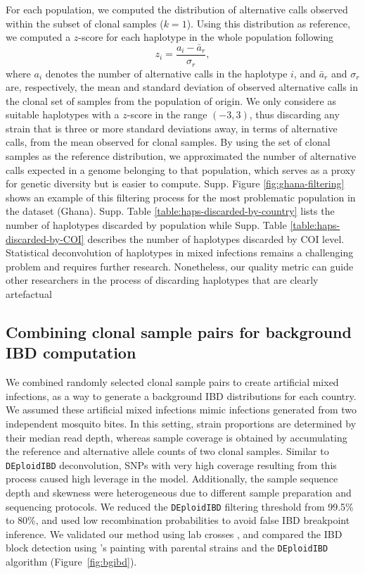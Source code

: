 \documentclass[9pt,lineno]{elife}
\begin{document}
\begin{appendixbox}
For each population, we computed the distribution of alternative calls observed within the subset of clonal samples ($k=1$). Using this distribution as reference, we computed a $z$-score for each haplotype in the whole population following $$z_i = \frac{a_i - \bar{a}_r}{\sigma_r},$$ where $a_i$ denotes the number of alternative calls in the haplotype $i$, and $\bar{a}_r$ and $\sigma_r$ are, respectively, the mean and standard deviation of observed alternative calls in the clonal set of samples from the population of origin. We only considere as suitable haplotypes with a $z$-score in the range $(-3,3)$, thus discarding any strain that is three or more standard deviations away, in terms of alternative calls, from the mean observed for clonal samples. By using the set of clonal samples as the reference distribution, we approximated the number of alternative calls expected in a genome belonging to that population, which serves as a proxy for genetic diversity but is easier to compute. Supp. Figure \ref{fig:ghana-filtering} shows an example of this filtering process for the most problematic population in the dataset (Ghana). Supp. Table \ref{table:haps-discarded-by-country} lists the number of haplotypes discarded by population while Supp. Table \ref{table:haps-discarded-by-COI} describes the number of haplotypes discarded by COI level. Statistical deconvolution of haplotypes in mixed infections remains a challenging problem and requires further research. Nonetheless, our quality metric can guide other researchers in the process of discarding haplotypes that are clearly artefactual

\subsection{Combining clonal sample pairs for background IBD computation}
We combined randomly selected clonal sample pairs to create artificial mixed infections, as a way to generate a background IBD distributions for each country. We assumed these artificial mixed infections mimic infections generated from two independent mosquito bites. In this setting, strain proportions are determined by their median read depth, whereas sample coverage is obtained by accumulating the reference and alternative allele counts of two clonal samples. Similar to {\tt DEploidIBD} deconvolution, SNPs with very high coverage resulting from this process caused high leverage in the model. Additionally, the sample sequence depth and skewness were heterogeneous due to different sample preparation and sequencing protocols. We reduced the {\tt DEploidIBD} filtering threshold from 99.5\% to 80\%, and used low recombination probabilities to avoid false IBD breakpoint inference. We validated our method using lab crosses \citep{Miles2016}, and compared the IBD block detection using \citet{Li2003}'s painting with parental strains and the {\tt DEploidIBD} algorithm (Figure~\ref{fig:bgibd}).
\end{appendixbox}
\end{document}
